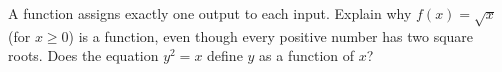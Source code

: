 A function assigns exactly one output to each input. Explain why $f(x)=\sqrt{x}$ (for $x\ge0$) is a function, even though every positive number has two square roots. Does the equation $y^2=x$ define $y$ as a function of $x$?
